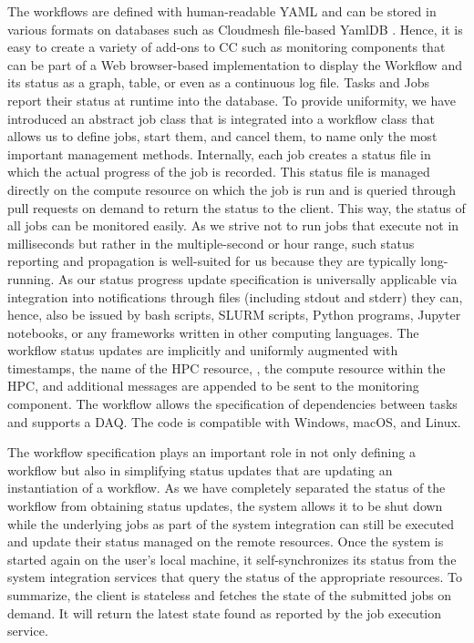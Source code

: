 \documentclass[utf8]{FrontiersinVancouver} %
\begin{document}
The workflows are defined with human-readable YAML and can be stored in various formats on databases such as Cloudmesh file-based YamlDB \citep{yamldb}. Hence, it is easy to create a variety of add-ons to CC such as monitoring components that can be part of a Web browser-based implementation to display the Workflow and its status as a graph, table, or even as a continuous log file.  Tasks and Jobs report their status at runtime into the database.  To provide uniformity,  we have introduced an abstract job class that is integrated into a workflow class that allows us to define jobs, start them, and cancel them, to name only the most important management methods. Internally, each job creates a status file in which the actual progress of the job is recorded.  This status file is managed directly on the compute resource on which the job is run and is queried through pull requests on demand to return the status to the client. This way, the status of all jobs can be monitored easily. As we strive not to run jobs that execute not in milliseconds but rather in the multiple-second or hour range, such status reporting and propagation is well-suited for us because they are typically long-running.  As our status progress update specification is universally applicable via integration into notifications through files (including stdout and stderr) they can, hence, also be issued by bash scripts, SLURM scripts, Python programs, Jupyter notebooks, or any frameworks written in other computing languages. The workflow status updates are implicitly and uniformly augmented with timestamps, the name of the HPC resource, , the compute resource within the HPC, and additional messages are appended to be sent to the monitoring component.  The workflow allows the specification of dependencies between tasks and supports a DAQ.
The code is compatible with Windows, macOS, and Linux.


The workflow specification plays an important role in not only defining a workflow but also in simplifying status updates that are updating an instantiation of a workflow. As we have completely separated the status of the workflow from obtaining status updates, the system allows it to be shut down while the underlying jobs as part of the system integration can still be executed and update their status managed on the remote resources. Once the system is started again on the user's local machine, it self-synchronizes its status from the system integration services that query the status of the appropriate resources. To summarize, the client is stateless and fetches the state of the submitted jobs on demand. It will return the latest state found as reported by the job execution service.
\end{document}
